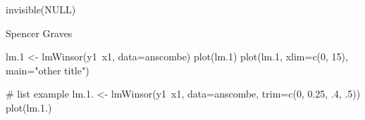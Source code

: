 \documentclass{article}
\begin{document}
\begin{Value}
invisible(NULL)
\end{Value}
\begin{Author}\relax
Spencer Graves
\end{Author}
\begin{SeeAlso}\relax
{}
\end{SeeAlso}
\begin{Examples}
\begin{ExampleCode}
lm.1 <- lmWinsor(y1~x1, data=anscombe)
plot(lm.1)
plot(lm.1, xlim=c(0, 15), main="other title")

# list example
lm.1. <- lmWinsor(y1~x1, data=anscombe, trim=c(0, 0.25, .4, .5)) 
plot(lm.1.)

\end{ExampleCode}
\end{Examples}
\end{document}
